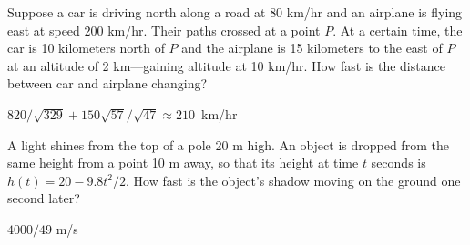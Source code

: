 \begin{exercises}
\begin{exercise} 
Suppose a car is driving north along a road at $80$ km/hr and an
airplane is flying east at speed $200$ km/hr. Their paths crossed at a
point $P$. At a certain time, the car is 10 kilometers north of $P$
and the airplane is 15 kilometers to the east of $P$ at an altitude of
2 km---gaining altitude at 10 km/hr. How fast is the distance between
car and airplane changing?
\begin{answer} \hbox{$820/\sqrt{329}+150\sqrt{57}/\sqrt{47}\approx 210$ km/hr}
\end{answer}\end{exercise}

\begin{exercise}
A light shines from the top of a pole 20 m high.  An object is dropped from
the same height from a point 10 m away, so that its height at time $t$
seconds is $h(t)=20-9.8t^2/2$.  How fast is the object's shadow
moving on the ground one second later?
\begin{answer} $4000/49$ m/s
\end{answer}\end{exercise}






\end{exercises}
